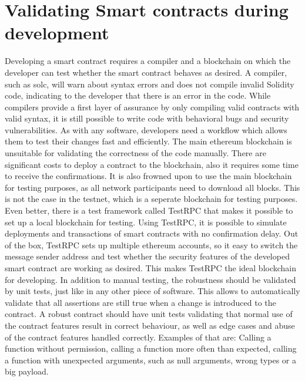 \section{Validating Smart contracts during development}
Developing a smart contract requires a compiler and a blockchain on which the developer can test whether the smart contract behaves as desired. A compiler, such as solc, will warn about syntax errors and does not compile invalid Solidity code, indicating to the developer that there is an error in the code. While compilers provide a first layer of assurance by only compiling valid contracts with valid syntax, it is still possible to write code with behavioral bugs and security vulnerabilities. As with any software, developers need a workflow which allows them to test their changes fast and efficiently. The main ethereum blockchain is unsuitable for validating the correctness of the code manually. There are significant costs to deploy a contract to the blockchain, also it requires some time to receive the confirmations. It is also frowned upon to use the main blockchain for testing purposes, as all network participants need to download all blocks. This is not the case in the testnet, which is a seperate blockchain for testing purposes. Even better, there is a test framework called TestRPC that makes it possible to set up a local blockchain for testing. Using TestRPC, it is possible to simulate deployments and transactions of smart contracts with no confirmation delay. Out of the box, TestRPC sets up multiple ethereum accounts, so it easy to switch the message sender address and test whether the security features of the developed smart contract are working as desired. This makes TestRPC the ideal blockchain for developing.
In addition to manual testing, the robustness should be validated by unit tests, just like in any other piece of software. This allows to automatically validate that all assertions are still true when a change is introduced to the contract. A robust contract should have unit tests validating that normal use of the contract features result in correct behaviour, as well as edge cases and abuse of the contract features handled correctly. Examples of that are: Calling a function without permission, calling a function more often than expected, calling a function with unexpected arguments, such as null arguments, wrong types or a big payload.
